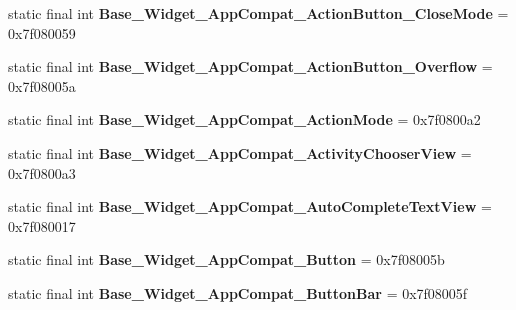 \begin{DoxyCompactItemize}
\item 
\hypertarget{classandroid_1_1support_1_1design_1_1_r_1_1style_a0b796011a9c0f9cf164281e2217c9300}{}static final int {\bfseries Base\+\_\+\+Widget\+\_\+\+App\+Compat\+\_\+\+Action\+Button\+\_\+\+Close\+Mode} = 0x7f080059\label{classandroid_1_1support_1_1design_1_1_r_1_1style_a0b796011a9c0f9cf164281e2217c9300}

\item 
\hypertarget{classandroid_1_1support_1_1design_1_1_r_1_1style_ac6620c5c97b037d4dd21cca350cea322}{}static final int {\bfseries Base\+\_\+\+Widget\+\_\+\+App\+Compat\+\_\+\+Action\+Button\+\_\+\+Overflow} = 0x7f08005a\label{classandroid_1_1support_1_1design_1_1_r_1_1style_ac6620c5c97b037d4dd21cca350cea322}

\item 
\hypertarget{classandroid_1_1support_1_1design_1_1_r_1_1style_afadec33a3b80d10805dd65b0600a194b}{}static final int {\bfseries Base\+\_\+\+Widget\+\_\+\+App\+Compat\+\_\+\+Action\+Mode} = 0x7f0800a2\label{classandroid_1_1support_1_1design_1_1_r_1_1style_afadec33a3b80d10805dd65b0600a194b}

\item 
\hypertarget{classandroid_1_1support_1_1design_1_1_r_1_1style_a1453879def50220f41b8becea7ed382b}{}static final int {\bfseries Base\+\_\+\+Widget\+\_\+\+App\+Compat\+\_\+\+Activity\+Chooser\+View} = 0x7f0800a3\label{classandroid_1_1support_1_1design_1_1_r_1_1style_a1453879def50220f41b8becea7ed382b}

\item 
\hypertarget{classandroid_1_1support_1_1design_1_1_r_1_1style_a9858e7079d9ba63620d2767358539c57}{}static final int {\bfseries Base\+\_\+\+Widget\+\_\+\+App\+Compat\+\_\+\+Auto\+Complete\+Text\+View} = 0x7f080017\label{classandroid_1_1support_1_1design_1_1_r_1_1style_a9858e7079d9ba63620d2767358539c57}

\item 
\hypertarget{classandroid_1_1support_1_1design_1_1_r_1_1style_aed1321016b20d3d28dcc091269449221}{}static final int {\bfseries Base\+\_\+\+Widget\+\_\+\+App\+Compat\+\_\+\+Button} = 0x7f08005b\label{classandroid_1_1support_1_1design_1_1_r_1_1style_aed1321016b20d3d28dcc091269449221}

\item 
\hypertarget{classandroid_1_1support_1_1design_1_1_r_1_1style_ae2f98036d7d39887e218051130a6451b}{}static final int {\bfseries Base\+\_\+\+Widget\+\_\+\+App\+Compat\+\_\+\+Button\+Bar} = 0x7f08005f\label{classandroid_1_1support_1_1design_1_1_r_1_1style_ae2f98036d7d39887e218051130a6451b}


\end{DoxyCompactItemize}

